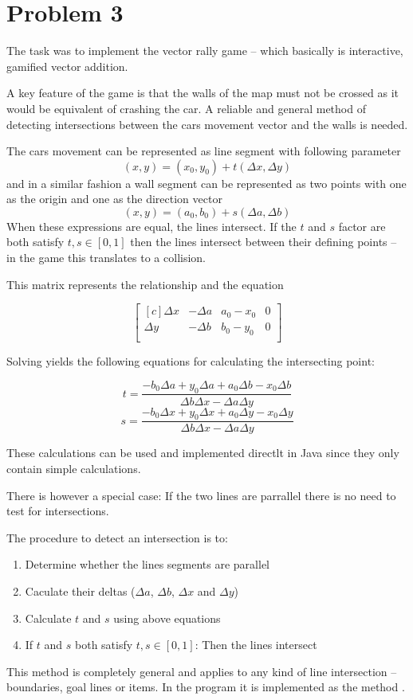 \section*{Problem 3}

The task was to implement the vector rally game -- which basically is
interactive, gamified vector addition.

A key feature of the game is that the walls of the map must not be crossed as
it would be equivalent of crashing the car. A reliable and general method of
detecting intersections between the cars movement vector and the walls is
needed.

The cars movement can be represented as line segment with following parameter
$$ (x, y) = (x_0, y_0) + t (\Delta x, \Delta y) $$
and in a similar fashion a wall segment can be represented as two points with
one as the origin and one as the direction vector
$$ (x, y) = (a_0, b_0) + s (\Delta a, \Delta b) $$
When these expressions are equal, the lines intersect. If the $t$ and $s$
factor are both satisfy $t, s \in [0,1]$ then the lines intersect between
their defining points -- in the game this translates to a collision.

This matrix represents the relationship and the equation

$$
\begin{bmatrix*}[c]
 \Delta x & -\Delta a & a_0 - x_0 & 0 \\
 \Delta y & -\Delta b & b_0 - y_0 & 0\\
\end{bmatrix*}
$$

Solving yields the following equations for calculating the 
intersecting point:

$$ t = \frac{-b_0 \Delta a + y_0 \Delta a + a_0 \Delta b - x_0 \Delta b}{\Delta b \Delta x - \Delta a \Delta y} $$
$$ s = \frac{-b_0 \Delta x + y_0 \Delta x + a_0 \Delta y - x_0 \Delta y}{\Delta b \Delta x - \Delta a \Delta y} $$

These calculations can be used and implemented directlt in Java since they
only contain simple calculations.

There is however a special case: If the two lines are parrallel there is no
need to test for intersections.

The procedure to detect an intersection is to:
\begin{enumerate}
\item Determine whether the lines segments are parallel
\item Caculate their deltas ($\Delta a$, $\Delta b$, $\Delta x$ and $\Delta y$)
\item Calculate $t$ and $s$ using above equations
\item If $t$ and $s$ both satisfy $t, s \in [0,1]$: Then the lines intersect
\end{enumerate}

This method is completely general and applies to any kind of line intersection
-- boundaries, goal lines or items. In the program it is implemented as the
method .
